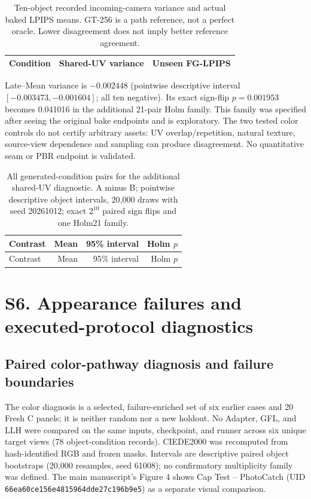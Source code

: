 \documentclass[11pt]{article}
\begin{document}
\begin{table}[ht]\centering\small
\caption{Ten-object recorded incoming-camera variance and actual baked LPIPS means. GT-256 is a path reference, not a perfect oracle. Lower disagreement does not imply better reference agreement.}\label{tab:cross-view015}
\begin{tabular}{lrr}\toprule Condition & Shared-UV variance & Unseen FG-LPIPS \\
\midrule\bottomrule\end{tabular}
\end{table}
Late--Mean variance is $-0.002448$ (pointwise descriptive interval $[-0.003473,-0.001604]$; all ten negative). Its exact sign-flip $p=0.001953$ becomes 0.041016 in the additional 21-pair Holm family. This family was specified after seeing the original bake endpoints and is exploratory. The two tested color controls do not certify arbitrary assets: UV overlap/repetition, natural texture, source-view dependence and sampling can produce disagreement. No quantitative seam or PBR endpoint is validated.

\begin{longtable}{p{}rrr}
\caption{All generated-condition pairs for the additional shared-UV diagnostic. A minus B; pointwise descriptive object intervals, 20,000 draws with seed 20261012; exact $2^{10}$ paired sign flips and one Holm21 family.}\label{tab:cross-view-all015}\\
\toprule Contrast & Mean & 95\% interval & Holm $p$ \\
\midrule\endfirsthead\toprule Contrast & Mean & 95\% interval & Holm $p$ \\
\midrule\endhead

\bottomrule\end{longtable}

\FloatBarrier
\section*{S6. Appearance failures and executed-protocol diagnostics}
\label{supp:group6}

\subsection*{Paired color-pathway diagnosis and failure boundaries}
The color diagnosis is a selected, failure-enriched set of six earlier cases and 20 Fresh C panels; it is neither random nor a new holdout. No Adapter, GFL, and LLH were compared on the same inputs, checkpoint, and runner across six unique target views (78 object-condition records). CIEDE2000 was recomputed from hash-identified RGB and frozen masks. Intervals are descriptive paired object bootstraps (20,000 resamples, seed 61008); no confirmatory multiplicity family was defined. The main manuscript's Figure 4 shows Cap Test -- PhotoCatch (UID \texttt{66ea60ce156e4815964dde27c196b9e5}) as a separate visual comparison.
\end{document}
